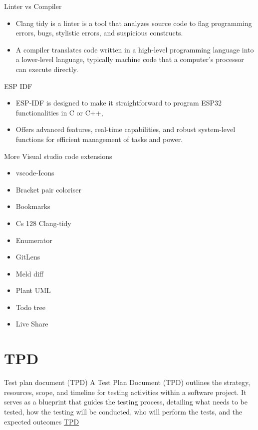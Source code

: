 \documentclass[10pt]{beamer}
\begin{document}
\begin{frame} {Linter vs Compiler}
  \begin{itemize}
    \item Clang tidy is a linter is a tool that analyzes source code to flag programming errors, bugs, stylistic errors, and suspicious constructs.
    \item A compiler translates code written in a high-level programming language into a lower-level language, typically machine code that a computer's processor can execute directly.
  \end{itemize}
\end{frame}

\begin{frame} {ESP IDF}
    \begin{itemize}
      \item  ESP-IDF is designed to make it straightforward to program ESP32 functionalities in C or C++, 
      \item Offers advanced features, real-time capabilities, and robust system-level functions for efficient management of tasks and power.
    \end{itemize}
\end{frame}

\begin{frame} {More Visual studio code extensions}
  \begin{itemize}
    \item vscode-Icons
    \item Bracket pair coloriser
    \item Bookmarks
    \item Cs 128 Clang-tidy
    \item Enumerator
    \item GitLens
    \item Meld diff
    \item Plant UML
    \item Todo tree
    \item Live Share
  \end{itemize}
  
\end{frame}

\section{TPD}
\begin{frame} {Test plan document (TPD)}
  A Test Plan Document (TPD) outlines the strategy, resources, scope, and timeline for testing activities within a software project. It serves as a blueprint that guides the testing process, detailing what needs to be tested, how the testing will be conducted, who will perform the tests, and the expected outcomes
  \href{https://docs.google.com/document/d/1lC8ZuRmzqU7DRiWEhfb8iwjCS3WTwKQk/edit?usp=sharing&ouid=109808472061203912811&rtpof=true&sd=true}{TPD}
\end{frame}
\end{document}
